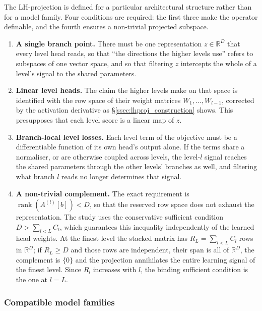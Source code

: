 The LH-projection is defined for a particular architectural structure rather than
for a model family. Four conditions are required: the first three make the
operator definable, and the fourth ensures a non-trivial projected subspace.

\begin{enumerate}
    \item \textbf{A single branch point.} There must be one representation
    $z\in\mathbb{R}^{D}$ that every level head reads, so that ``the directions the
    higher levels use'' refers to subspaces of one vector space, and so that
    filtering $z$ intercepts the whole of a level's signal to the shared
    parameters.
    \item \textbf{Linear level heads.} The claim the higher levels make on that
    space is identified with the row space of their weight matrices
    $W_1,\dots,W_{l-1}$, corrected by the activation derivative as
    \S\ref{ssec:lhproj_construction} shows. This presupposes that each level score
    is a linear map of $z$.
    \item \textbf{Branch-local level losses.} Each level term of the objective must
    be a differentiable function of its own head's output alone. If the terms share
    a normaliser, or are otherwise coupled across levels, the level-$l$ signal
    reaches the shared parameters through the other levels' branches as well, and
    filtering what branch $l$ reads no longer determines that signal.
    \item \textbf{A non-trivial complement.} The exact requirement is
    $\operatorname{rank}(A^{(l)}[b])<D$, so that the reserved row space does not
    exhaust the representation. The study uses the conservative sufficient
    condition $D>\sum_{l<L}C_l$, which guarantees this inequality independently
    of the learned head weights. At the finest level the stacked matrix has
    $R_L=\sum_{l<L}C_l$ rows in $\mathbb{R}^{D}$; if $R_L\ge D$ and those rows are
    independent, their span is all of $\mathbb{R}^{D}$, the complement is
    $\{0\}$ and the projection annihilates the entire learning signal of the
    finest level. Since $R_l$ increases with $l$, the binding sufficient
    condition is the one at $l=L$.
\end{enumerate}

\subsubsection{Compatible model families}

